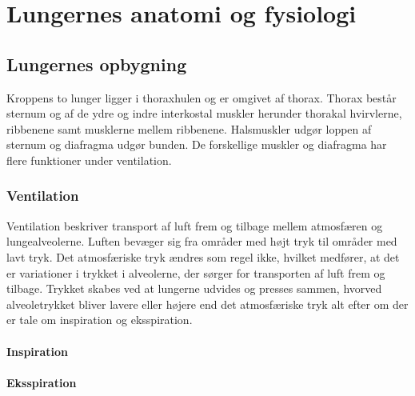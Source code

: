 \chapter{Lungernes anatomi og fysiologi}
\section{Lungernes opbygning}
Kroppens to lunger ligger i thoraxhulen og er omgivet af thorax. Thorax består sternum og af de ydre og indre interkostal muskler herunder thorakal hvirvlerne, ribbenene samt musklerne mellem ribbenene. Halsmuskler udgør loppen af sternum og diafragma udgør bunden. De forskellige muskler og diafragma har flere funktioner under ventilation. 

\subsection{Ventilation}
Ventilation beskriver transport af luft frem og tilbage mellem atmosfæren og lungealveolerne. Luften bevæger sig fra områder med højt tryk til områder med lavt tryk. Det atmosfæriske tryk ændres som regel ikke, hvilket medfører, at det er variationer i trykket i alveolerne, der sørger for transporten af luft frem og tilbage. Trykket skabes ved at lungerne udvides og presses sammen, hvorved alveoletrykket bliver lavere eller højere end det atmosfæriske tryk alt efter om der er tale om inspiration og eksspiration. 

\subsubsection{Inspiration}

\subsubsection{Eksspiration}